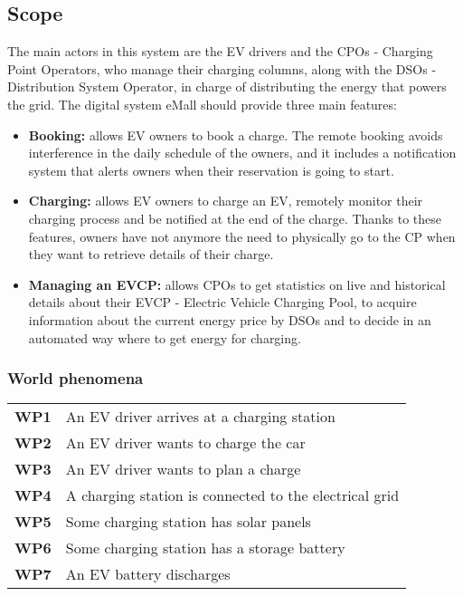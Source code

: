 \subsection{Scope}
The main actors in this system are the EV drivers and the CPOs - Charging Point Operators, who manage their charging columns, along with the DSOs - Distribution System Operator, in charge of distributing the energy that powers the grid.
The digital system eMall should provide three main features:
\begin{itemize}
    \item \textbf{Booking:} allows EV owners to book a charge. The remote booking avoids interference
          in the daily schedule of the owners, and it includes a notification
          system that alerts owners when their reservation is going to start.
    \item \textbf{Charging:} allows EV owners to charge an EV, remotely monitor their charging
          process and be notified at the end of the charge.
          Thanks to these features, owners have not anymore the need to
          physically go to the CP when they want to retrieve details of their charge.
    \item  \textbf{Managing an EVCP:} allows CPOs to get statistics on live and historical details
          about their EVCP - Electric Vehicle Charging Pool, to acquire information about the current energy price by
          DSOs and to decide in an automated way where to get energy for charging.
\end{itemize}




\subsubsection{World phenomena}
\begin{table}[H]
    \begin{tabularx}{\textwidth}{cX}
        \toprule
        \textbf{WP1} & An EV driver arrives at a charging station             \\
        \textbf{WP2} & An EV driver wants to charge the car                   \\
        \textbf{WP3} & An EV driver wants to plan a charge                    \\
        \textbf{WP4} & A charging station is connected to the electrical grid \\
        \textbf{WP5} & Some charging station has solar panels                 \\
        \textbf{WP6} & Some charging station has a storage battery            \\
        \textbf{WP7} & An EV battery discharges                               \\ \bottomrule
    \end{tabularx}
\end{table}
